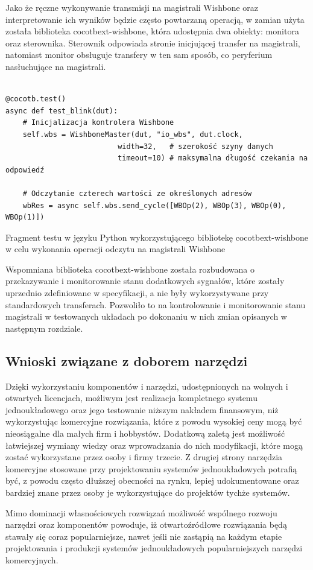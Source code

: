 Jako że ręczne wykonywanie transmisji na magistrali Wishbone oraz interpretowanie ich wyników będzie często powtarzaną operacją, w zamian użyta została biblioteka cocotbext-wishbone\cite{cocotbext-wishbone:2022:Online}, która udostępnia dwa obiekty: monitora oraz sterownika. Sterownik odpowiada stronie inicjującej transfer na magistrali, natomiast monitor obsługuje transfery w ten sam sposób, co peryferium nasłuchujące na magistrali.

\begin{longlisting}
\begin{verbatim}

@cocotb.test()
async def test_blink(dut):
    # Inicjalizacja kontrolera Wishbone
    self.wbs = WishboneMaster(dut, "io_wbs", dut.clock,
                          width=32,   # szerokość szyny danych
                          timeout=10) # maksymalna długość czekania na odpowiedź

    # Odczytanie czterech wartości ze określonych adresów
    wbRes = async self.wbs.send_cycle([WBOp(2), WBOp(3), WBOp(0), WBOp(1)])
\end{verbatim}
\caption{\label{lst:tooling-cocotbext-wishbone-example}Fragment testu w języku Python wykorzystującego bibliotekę cocotbext-wishbone w celu wykonania operacji odczytu na magistrali Wishbone}
\end{longlisting}

Wspomniana biblioteka cocotbext-wishbone została rozbudowana o przekazywanie i monitorowanie stanu dodatkowych sygnałów, które zostały uprzednio zdefiniowane w specyfikacji, a nie były wykorzystywane przy standardowych transferach. Pozwoliło to na kontrolowanie i monitorowanie stanu magistrali w testowanych układach po dokonaniu w nich zmian opisanych w następnym rozdziale.

\subsection{Wnioski związane z doborem narzędzi}

Dzięki wykorzystaniu komponentów i narzędzi, udostępnionych na wolnych i otwartych licencjach, możliwym jest realizacja kompletnego systemu jednoukładowego oraz jego testowanie niższym nakładem finansowym, niż wykorzystując komercyjne rozwiązania, które z powodu wysokiej ceny mogą być nieosiągalne dla małych firm i hobbystów.
Dodatkową zaletą jest możliwość łatwiejszej wymiany wiedzy oraz wprowadzania do nich modyfikacji, które mogą zostać wykorzystane przez osoby i firmy trzecie.
Z drugiej strony narzędzia komercyjne stosowane przy projektowaniu systemów jednoukładowych potrafią być, z powodu często dłuższej obecności na rynku, lepiej udokumentowane oraz bardziej znane przez osoby je wykorzystujące do projektów tychże systemów.

Mimo dominacji własnościowych rozwiązań możliwość wspólnego rozwoju narzędzi oraz komponentów powoduje, iż otwartoźródłowe rozwiązania będą stawały się coraz popularniejsze, nawet jeśli nie zastąpią na każdym etapie projektowania i produkcji systemów jednoukładowych popularniejszych narzędzi komercyjnych.

